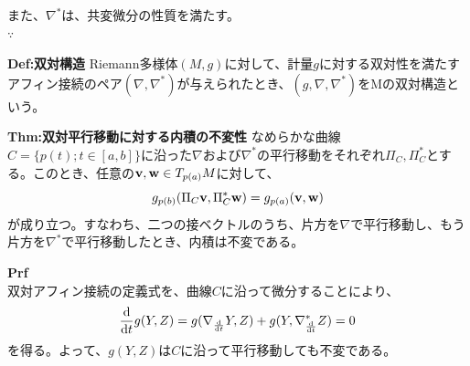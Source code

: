 \documentclass[a4paper,11pt]{jsarticle}
\numberwithin{equation}{section}
\begin{document}
また、$\nabla^*$は、共変微分の性質を満たす。\\
$\because$\\

\begin{itembox}[l]{\textbf{Def:双対構造}}
    Riemann多様体$(M,g)$に対して、計量$g$に対する双対性を満たすアフィン接続のペア$(\nabla,\nabla^*)$が与えられたとき、$(g,\nabla,\nabla^*)$をMの双対構造という。
\end{itembox}

\begin{itembox}[l]{\textbf{Thm:双対平行移動に対する内積の不変性}}
    なめらかな曲線$C = \{p(t) ; t \in [a,b]\}$に沿った$\nabla$および$\nabla^*$の平行移動をそれぞれ$\Pi_C,\Pi_C^*$とする。このとき、任意の$\vb{v},\vb{w} \in T_{p(a)}M$に対して、
    \begin{equation}
        g_{p(b)}(\Pi_C \vb{v},\Pi_C^* \vb{w}) = g_{p(a)}(\vb{v},\vb{w})
    \end{equation}
    が成り立つ。すなわち、二つの接ベクトルのうち、片方を$\nabla$で平行移動し、もう片方を$\nabla^*$で平行移動したとき、内積は不変である。

\end{itembox}
\textbf{Prf}\\
双対アフィン接続の定義式を、曲線$C$に沿って微分することにより、
\begin{equation}
    \dv{t}g(Y,Z) =g(\nabla_{\dv{t}}Y,Z) + g(Y,\nabla^*_{\dv{t}}Z)=0
\end{equation}
を得る。よって、$g(Y,Z)$は$C$に沿って平行移動しても不変である。\hfill\qedsymbol
\end{document}
